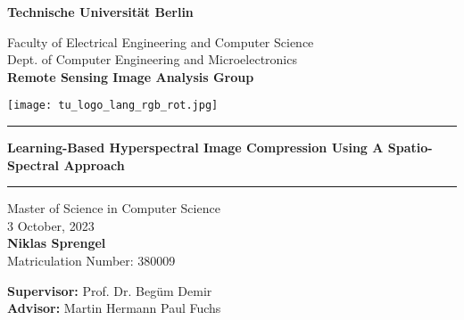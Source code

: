 \thispagestyle{empty}
\begin{center}

{\LARGE \textbf{Technische Universit{\"a}t Berlin}}

\vspace{0.6cm}

{\large Faculty of Electrical Engineering and Computer Science\\[1mm]}
{\large Dept. of Computer Engineering and Microelectronics\\[1mm]}
{\large \textbf{Remote Sensing Image Analysis Group}\\[5mm]}

\vspace*{0.5cm}

\texttt{[image: tu\_logo\_lang\_rgb\_rot.jpg]} %

\vspace{0.2cm}
\begin{center}
\rule{0.85\textwidth}{.4pt}
\end{center}
\vspace{0.2cm}
{\LARGE \textbf{Learning-Based Hyperspectral Image Compression Using A Spatio-Spectral Approach}} %
\begin{center}
\rule{0.85\textwidth}{.4pt}
\end{center}
\vspace{0.5cm}
{\LARGE Master of Science in Computer Science}\\
\vspace*{0.2cm}
{\large 3 October, 2023}\\ %
\vspace*{0.5cm}
{\LARGE \textbf{Niklas Sprengel}}
\\
\vspace*{0.5cm}
{\large Matriculation Number: 380009} \\
\vspace*{0.5cm}
\begin{flushleft}
\hspace*{1.2cm}
{\large \textbf{Supervisor:}} \hspace*{0.5cm} {\large Prof. Dr. Beg{\"u}m Demir}\\
\vspace*{0.5cm}
\hspace*{1.2cm}
{\large \textbf{Advisor:}} \hspace*{1.15cm} {\large Martin Hermann Paul Fuchs}
\vspace{2cm}
\end{flushleft}

\end{center}




